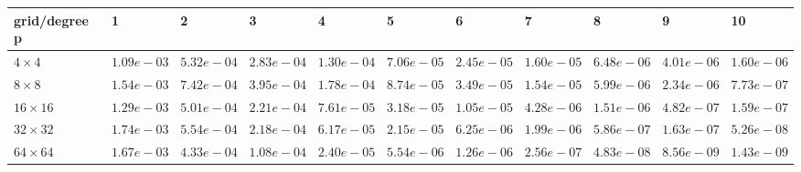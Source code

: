 \begin{tabular}{lllllllllll}
\hline
 grid/degree p   & 1          & 2          & 3          & 4          & 5          & 6          & 7          & 8          & 9          & 10         \\
\hline
 $4 \times 4$    & $1.09e-03$ & $5.32e-04$ & $2.83e-04$ & $1.30e-04$ & $7.06e-05$ & $2.45e-05$ & $1.60e-05$ & $6.48e-06$ & $4.01e-06$ & $1.60e-06$ \\
 $8 \times 8$    & $1.54e-03$ & $7.42e-04$ & $3.95e-04$ & $1.78e-04$ & $8.74e-05$ & $3.49e-05$ & $1.54e-05$ & $5.99e-06$ & $2.34e-06$ & $7.73e-07$ \\
 $16 \times 16$  & $1.29e-03$ & $5.01e-04$ & $2.21e-04$ & $7.61e-05$ & $3.18e-05$ & $1.05e-05$ & $4.28e-06$ & $1.51e-06$ & $4.82e-07$ & $1.59e-07$ \\
 $32 \times 32$  & $1.74e-03$ & $5.54e-04$ & $2.18e-04$ & $6.17e-05$ & $2.15e-05$ & $6.25e-06$ & $1.99e-06$ & $5.86e-07$ & $1.63e-07$ & $5.26e-08$ \\
 $64 \times 64$  & $1.67e-03$ & $4.33e-04$ & $1.08e-04$ & $2.40e-05$ & $5.54e-06$ & $1.26e-06$ & $2.56e-07$ & $4.83e-08$ & $8.56e-09$ & $1.43e-09$ \\
\hline
\end{tabular}